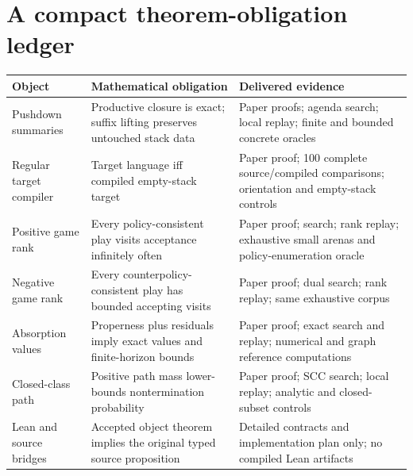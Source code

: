 \section{A compact theorem-obligation ledger}
\begin{longtable}{@{}p{}p{}p{}@{}}
\toprule
Object & Mathematical obligation & Delivered evidence \\
\midrule\endhead
Pushdown summaries & Productive closure is exact; suffix lifting preserves untouched stack data & Paper proofs; agenda search; local replay; finite and bounded concrete oracles \\
Regular target compiler & Target language iff compiled empty-stack target & Paper proof; 100 complete source/compiled comparisons; orientation and empty-stack controls \\
Positive game rank & Every policy-consistent play visits acceptance infinitely often & Paper proof; search; rank replay; exhaustive small arenas and policy-enumeration oracle \\
Negative game rank & Every counterpolicy-consistent play has bounded accepting visits & Paper proof; dual search; rank replay; same exhaustive corpus \\
Absorption values & Properness plus residuals imply exact values and finite-horizon bounds & Paper proof; exact search and replay; numerical and graph reference computations \\
Closed-class path & Positive path mass lower-bounds nontermination probability & Paper proof; SCC search; local replay; analytic and closed-subset controls \\
Lean and source bridges & Accepted object theorem implies the original typed source proposition & Detailed contracts and implementation plan only; no compiled Lean artifacts \\
\bottomrule
\end{longtable}
